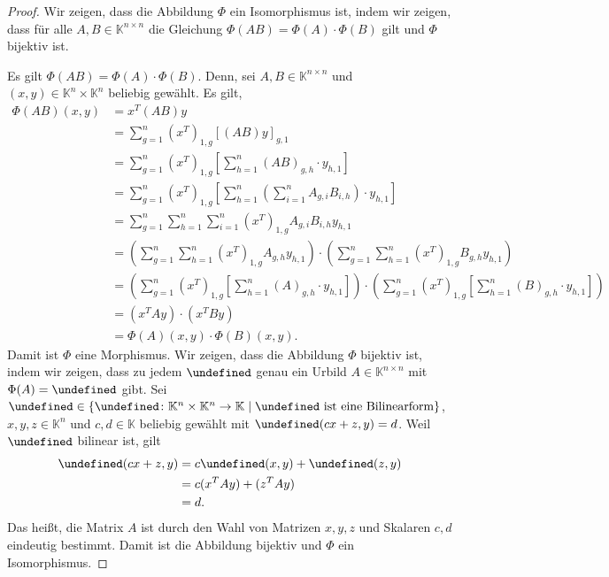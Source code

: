 \documentclass[draft,a5paper]{article}
\let\phi\undefined
\newcommand{\phi}{\varphi}
\begin{document}
\begin{proof}
  Wir zeigen, dass die Abbildung \(\Phi\) ein Isomorphismus ist, indem
  wir zeigen, dass für alle \(A, B \in \mathbb{K}^{n \times n}\) die Gleichung
  \(\Phi(AB) = \Phi(A) \cdot \Phi(B)\) gilt und \(\Phi\) bijektiv ist.

  Es gilt \(\Phi(AB) = \Phi(A) \cdot \Phi(B)\).  Denn, sei \(A, B \in \mathbb{K}^{n \times n}\) und
  \((x, y) \in \mathbb{K}^{n} \times \mathbb{K}^{n}\) beliebig gewählt. Es gilt,
  \begin{align*}
    \Phi(AB)(x,y)
    &= x^{T}(AB)y \\
    &= \sum_{g=1}^{n}{(x^{T})_{1,g}\left[(AB)y\right]_{g,1}} \\
    &= \sum_{g=1}^{n}{(x^{T})_{1,g}\left[\sum_{h=1}^{n}{(AB)_{g,h} \cdot y_{h,1}}\right]} \\
    &=
      \sum_{g=1}^{n}{(x^{T})_{1,g}\left[\sum_{h=1}^{n}{\left(\sum_{i=1}^{n}{A_{g,i}B_{i,h}}\right)
      \cdot y_{h,1}}\right]} \\
    &= \sum_{g=1}^{n}\sum_{h=1}^{n}\sum_{i=1}^{n} (x^{T})_{1,g} A_{g,i}B_{i,h}
      y_{h,1} \\
    &= \left(\sum_{g=1}^{n}\sum_{h=1}^{n}(x^{T})_{1,g}A_{g,h}y_{h,1}\right)
      \cdot \left(\sum_{g=1}^{n}\sum_{h=1}^{n}(x^{T})_{1,g}B_{g,h}y_{h,1}\right) \\
    &= \left(\sum_{g=1}^{n}{(x^{T})_{1,g}\left[\sum_{h=1}^{n}{(A)_{g,h} \cdot
      y_{h,1}}\right]}\right) \cdot \left(\sum_{g=1}^{n}{(x^{T})_{1,g}\left[\sum_{h=1}^{n}{(B)_{g,h} \cdot
      y_{h,1}}\right]}\right) \\
    &= (x^{T}Ay) \cdot (x^{T}By) \\
    &= \Phi(A)(x,y) \cdot \Phi(B)(x,y).
  \end{align*}
  Damit ist \(\Phi\) eine Morphismus.  Wir zeigen, dass die Abbildung
  \(\Phi\) bijektiv ist, indem wir zeigen, dass zu jedem \(\phi\) genau ein
  Urbild \(A \in \mathbb{K}^{n \times n}\) mit \(\Phi(A) = \phi\) gibt.  Sei
  \(\phi \in \{\phi \colon \mathbb{K}^{n} \times \mathbb{K}^{n} \to \mathbb{K} \mid \phi \text{ ist eine Bilinearform}\}\),
  \(x,y,z \in \mathbb{K}^{n}\) und \(c, d \in \mathbb{K}\) beliebig gewählt mit
  \(\phi(cx+z,y) = d\).  Weil \(\phi\) bilinear ist, gilt
  \begin{align*}
    \phi(cx+z,y)
    &= c\phi(x,y) +  \phi(z,y) \\
    &= c(x^{T}Ay) + (z^{T}Ay) \\
    &= d.
  \end{align*}
  Das heißt, die Matrix \(A\) ist durch den Wahl von Matrizen \(x, y,
  z\) und Skalaren \(c, d\) eindeutig bestimmt.  Damit ist die
  Abbildung bijektiv und \(\Phi\) ein Isomorphismus.
\end{proof}
\end{document}
